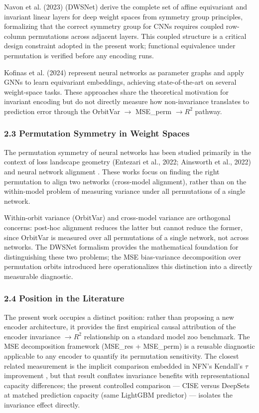 Navon et al. (2023) (DWSNet) derive the complete set of affine equivariant and invariant linear layers for deep weight spaces from symmetry group principles, formalizing that the correct symmetry group for CNNs requires coupled row-column permutations across adjacent layers. This coupled structure is a critical design constraint adopted in the present work; functional equivalence under permutation is verified before any encoding runs.

Kofinas et al. (2024) represent neural networks as parameter graphs and apply GNNs to learn equivariant embeddings, achieving state-of-the-art on several weight-space tasks. These approaches share the theoretical motivation for invariant encoding but do not directly measure how non-invariance translates to prediction error through the OrbitVar $\rightarrow$ MSE\_perm $\rightarrow R^2$ pathway.

\subsubsection{2.3 Permutation Symmetry in Weight Spaces}

The permutation symmetry of neural networks has been studied primarily in the context of loss landscape geometry (Entezari et al., 2022; Ainsworth et al., 2022) and neural network alignment \citep{Wang2020}. These works focus on finding the right permutation to align two networks (cross-model alignment), rather than on the within-model problem of measuring variance under all permutations of a single network.

Within-orbit variance (OrbitVar) and cross-model variance are orthogonal concerns: post-hoc alignment reduces the latter but cannot reduce the former, since OrbitVar is measured over all permutations of a single network, not across networks. The DWSNet formalism \citep{Navon2023Equivariant} provides the mathematical foundation for distinguishing these two problems; the MSE bias-variance decomposition over permutation orbits introduced here operationalizes this distinction into a directly measurable diagnostic.

\subsubsection{2.4 Position in the Literature}

The present work occupies a distinct position: rather than proposing a new encoder architecture, it provides the first empirical causal attribution of the encoder invariance $\rightarrow R^2$ relationship on a standard model zoo benchmark. The MSE decomposition framework (MSE\_res + MSE\_perm) is a reusable diagnostic applicable to any encoder to quantify its permutation sensitivity. The closest related measurement is the implicit comparison embedded in NFN's Kendall's $\tau$ improvement \citep{Zhou2023Permutation}, but that result conflates invariance benefits with representational capacity differences; the present controlled comparison --- CISE versus DeepSets at matched prediction capacity (same LightGBM predictor) --- isolates the invariance effect directly.

